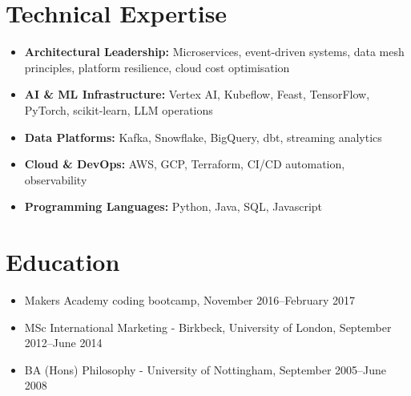 \documentclass[a4paper]{scrartcl}
\begin{document}
\section*{Technical Expertise}
\begin{itemize}
	\item \textbf{Architectural Leadership:} Microservices, event-driven systems, data mesh principles, platform resilience, cloud cost optimisation
	\item \textbf{AI \& ML Infrastructure:} Vertex AI, Kubeflow, Feast, TensorFlow, PyTorch, scikit-learn, LLM operations
	\item \textbf{Data Platforms:} Kafka, Snowflake, BigQuery, dbt, streaming analytics
	\item \textbf{Cloud \& DevOps:} AWS, GCP, Terraform, CI/CD automation, observability
	\item \textbf{Programming Languages:} Python, Java, SQL, Javascript
\end{itemize}

\section*{Education}
\begin{itemize}
	\item Makers Academy coding bootcamp, November 2016--February 2017
	\item MSc International Marketing - Birkbeck, University of London, September 2012--June 2014
	\item BA (Hons) Philosophy - University of Nottingham, September 2005--June 2008
\end{itemize}
\end{document}
